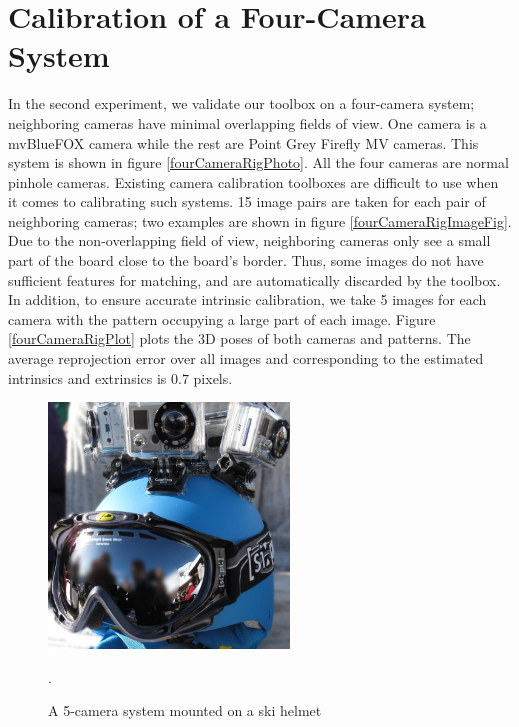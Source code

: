 \documentclass{report}
\begin{document}
\section{Calibration of a Four-Camera System}
In the second experiment, we validate our toolbox on a four-camera system; neighboring cameras have minimal overlapping fields of view. One camera is a mvBlueFOX camera while the rest are Point Grey Firefly MV cameras. This system is shown in figure \ref{fourCameraRigPhoto}. All the four cameras are normal pinhole cameras. Existing camera calibration toolboxes are difficult to use when it comes to calibrating such systems. 15 image pairs are taken for each pair of neighboring cameras; two examples are shown in figure \ref{fourCameraRigImageFig}. Due to the non-overlapping field of view, neighboring cameras only see a small part of the board close to the board's border. Thus, some images do not have sufficient features for matching, and are automatically discarded by the toolbox. In addition, to ensure accurate intrinsic calibration, we take 5 images for each camera with the pattern occupying a large part of each image. Figure \ref{fourCameraRigPlot} plots the 3D poses of both cameras and patterns. The average reprojection error over all images and corresponding to the estimated intrinsics and extrinsics is $0.7$ pixels. 

\begin{figure}
\centering 
\includegraphics[width=0.57\textwidth]{images/helmet} 
\caption{A 5-camera system mounted on a ski helmet}. 
\label{helmetPhoto}
\end{figure}
\end{document}
